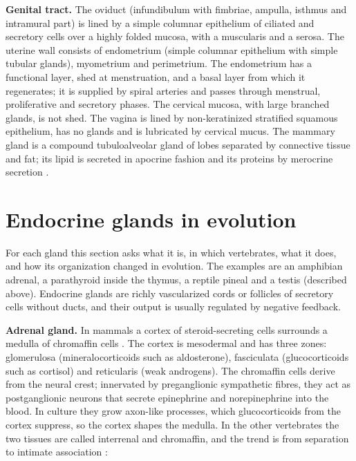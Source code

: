 \textbf{Genital tract.} The oviduct
(infundibulum with fimbriae, ampulla, isthmus
and intramural part) is lined by a simple
columnar epithelium of ciliated and secretory
cells over a highly folded mucosa, with a
muscularis and a serosa. The uterine wall
consists of endometrium (simple columnar
epithelium with simple tubular glands),
myometrium and perimetrium. The endometrium
has a functional layer, shed at menstruation,
and a basal layer from which it regenerates;
it is supplied by spiral arteries and passes
through menstrual, proliferative and
secretory phases. The cervical mucosa, with
large branched glands, is not shed. The
vagina is lined by non-keratinized stratified
squamous epithelium, has no glands and is
lubricated by cervical mucus. The mammary
gland is a compound tubuloalveolar gland of
lobes separated by connective tissue and fat;
its lipid is secreted in apocrine fashion and
its proteins by merocrine secretion
\cite[Chapter 23]{ross2011histology}.

\section{Endocrine glands in evolution}
\label{section-endocrine}

For each gland this section asks what it is, in
which vertebrates, what it does, and how its
organization changed in evolution. The
examples are an amphibian adrenal, a
parathyroid inside the thymus, a reptile
pineal and a testis (described above).
Endocrine glands are richly vascularized
cords or follicles of secretory cells without
ducts, and their output is usually regulated
by negative feedback.

\textbf{Adrenal gland.} In mammals a cortex
of steroid-secreting cells surrounds a
medulla of chromaffin cells \cite[Chapter
21]{ross2011histology}. The cortex is
mesodermal and has three zones: glomerulosa
(mineralocorticoids such as aldosterone),
fasciculata (glucocorticoids such as
cortisol) and reticularis (weak androgens).
The chromaffin cells derive from the neural
crest; innervated by preganglionic
sympathetic fibres, they act as
postganglionic neurons that secrete
epinephrine and norepinephrine into the
blood. In culture they grow axon-like
processes, which glucocorticoids from the
cortex suppress, so the cortex shapes the
medulla. In the other vertebrates the two
tissues are called interrenal and chromaffin,
and the trend is from separation to intimate
association \cite[Chapter
13]{andrew1959comparative}:


